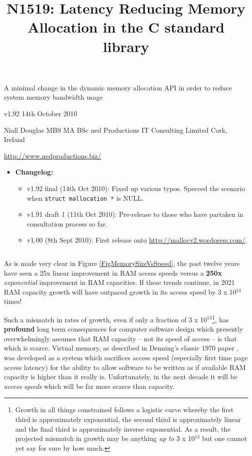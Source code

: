 \documentclass[wd]{isov2}
\newcommand{\superscript}[1]{\ensuremath{^{\textrm{#1}}}}
\begin{document}
\title{N1519: Latency Reducing Memory Allocation in the C standard library}{\linebreak \large{A minimal change in the dynamic memory allocation API in order to reduce system memory bandwidth usage}}{}

v1.92 14th October 2010

Niall Douglas MBS MA BSc \hfill ned Productions IT Consulting Limited \linebreak
Cork, Ireland \hfill {\url{http://www.nedproductions.biz/}

\small{\begin{itemize}
\item \textbf{Changelog:}
\tiny{\begin{itemize}
\item v1.92 final (14th Oct 2010): Fixed up various typos. Specced the scenario when \texttt{struct mallocation *} is NULL.
\item v1.91 draft 1 (11th Oct 2010): Pre-release to those who have partaken in consultation process so far.
\item v1.00 (8th Sept 2010): First release onto \url{http://mallocv2.wordpress.com/}.
\end{itemize}}
\end{itemize}}

\begin{verbatim}
\end{verbatim}

\begin{foreword}
As is made very clear in Figure \ref{FigMemorySizeVsSpeed}, the past twelve years have seen a 25x linear improvement in RAM access speeds versus a \textbf{250x} \emph{exponential} improvement in RAM capacities. If these trends continue, in 2021 RAM capacity growth will have outpaced growth in its access speed by 3 x 10\superscript{13} times!

Such a mismatch in rates of growth, even if only a fraction of 3 x 10\superscript{13}\footnote{Growth in all things constrained follows a logistic curve whereby the first third is approximately exponential, the second third is approximately linear and the final third is approximately inverse exponential. As a result, the projected mismatch in growth may be anything \emph{up to} 3 x 10\superscript{13} but one cannot yet say for sure by how much.}, has \textbf{profound} long term consequences for computer software design which presently overwhelmingly assumes that RAM capacity -- not its speed of access -- is that which is scarce. Virtual memory, as described in Denning's classic 1970 paper , was developed as a system which sacrifices access speed (especially first time page access latency) for the ability to allow software to be written as if available RAM capacity is higher than it really is. Unfortunately, in the next decade it will be \emph{access speeds} which will be far more scarce than capacity.


\end{foreword}}
\end{document}
